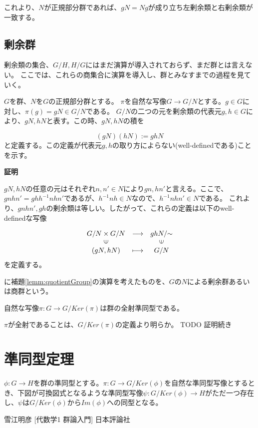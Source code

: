\documentclass[dvipdfmx,autodetect-engine]{jsarticle}
\begin{document}
これより、$N$が正規部分群であれば、$gN = Ng$が成り立ち左剰余類と右剰余類が一致する。

\subsection{剰余群}

剰余類の集合、$G/H, H/G$にはまだ演算が導入されておらず、まだ群とは言えない。
ここでは、これらの商集合に演算を導入し、群とみなすまでの過程を見ていく。

\label{lemm:quotientGroup}

$G$を群、$N$を$G$の正規部分群とする。
$\pi$を自然な写像$G \to G/N$とする。$g \in G$に対し、$\pi(g) = gN \in G/N$である。
$G/N$の二つの元を剰余類の代表元$g, h \in G$により、$gN, hN$と表す。この時、$gN, hN$の積を

$$
(gN)(hN) := ghN
$$
と定義する。この定義が代表元$g, h$の取り方によらない(well-definedである)ことを示す。

{\bf 証明}

$gN, hN$の任意の元はそれぞれ$n, n' \in N$により$gn, hn'$と言える。ここで、$gnhn' = ghh^{-1}nhn'$であるが、$h^{-1}nh \in N$なので、$h^{-1}nhn' \in N$である。
これより、$gnhn', gh$の剰余類は等しい。したがって、これらの定義は以下のwell-definedな写像

$$
\begin{array}{ccc}
G/N \times G/N & {\longrightarrow} & ghN/{\sim} \\
\rotatebox{90}{$\in$} & & \rotatebox{90}{$\in$} \\
(gN, hN) & \longmapsto & G/N
\end{array}
$$
を定義する。

に補題\ref{lemm:quotientGroup}の演算を考えたものを、$G$の$N$による剰余群あるいは商群という。

\prop 自然な写像$\pi: G \to G/Ker(\pi)$は群の全射準同型である。

$\pi$が全射であることは、$G/Ker(\pi)$の定義より明らか。
TODO 証明続き

\section{準同型定理}


$\phi: G \to H$を群の準同型とする。$\pi: G \to G/Ker(\phi)$を自然な準同型写像とするとき、下図が可換図式となるような準同型写像$\psi: G/Ker(\phi) \to H$がただ一つ存在し、$\psi$は$G/Ker(\phi)$から$Im(\phi)$への同型となる。



\begin{thebibliography}{n}
 雪江明彦 [代数学1 群論入門] 日本評論社
\end{thebibliography}
\end{document}
